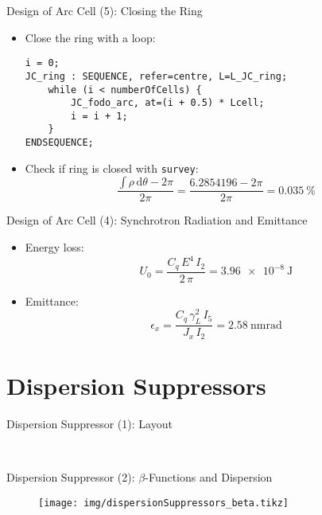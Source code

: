 \documentclass{beamer}
\begin{document}
\begin{frame}[t,fragile]{Design of Arc Cell (5): Closing the Ring}
\begin{itemize}
\item Close the ring with a loop:
\begin{lstlisting}
i = 0;
JC_ring : SEQUENCE, refer=centre, L=L_JC_ring; 
    while (i < numberOfCells) {
        JC_fodo_arc, at=(i + 0.5) * Lcell;
        i = i + 1;
    }
ENDSEQUENCE;
\end{lstlisting}
\item Check if ring is closed with \texttt{survey}:
\begin{equation*}
\frac{\int\rho\,\text{d}\theta-2\pi}{2\pi}=\frac{\num{6.2854196}-2\pi}{2\pi}=\SI{0.035}{\percent}
\end{equation*}
\end{itemize}
\end{frame}

\begin{frame}[t]{Design of Arc Cell (4): Synchrotron Radiation and Emittance}
\begin{itemize}
\item Energy loss:
\begin{equation*}
U_0 = \frac{C_q\,E^4\,I_2}{2\,\pi}=\SI{3.96e-8}{\joule}
\end{equation*}
\item Emittance:
\begin{equation*}
\epsilon_x = \frac{C_q\,\gamma_L^2\,I_5}{J_x\,I_2}=\SI{2.58}{\nano\meter\radian}
\end{equation*}
\end{itemize}
\end{frame}





\section{Dispersion Suppressors}
\begin{frame}[t]{Dispersion Suppressor (1): Layout}
\begin{figure}
  \centering
  \\
\end{figure}
\end{frame}

\begin{frame}[t,fragile]{Dispersion Suppressor (2): $\beta$-Functions and Dispersion}
\begin{figure}
\centering
\texttt{[image: img/dispersionSuppressors\_beta.tikz]}
\end{figure}
\end{frame}
\end{document}
